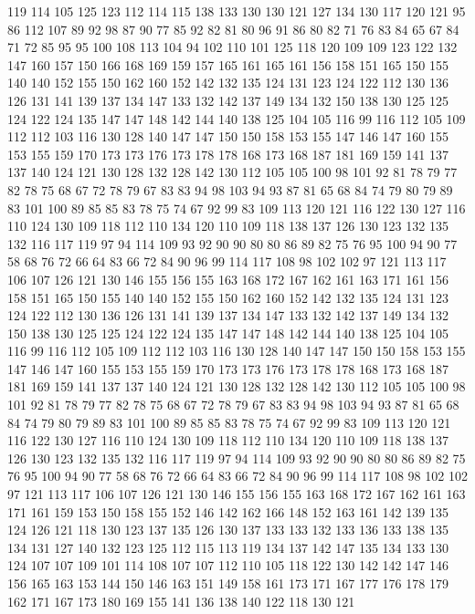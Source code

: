 119 114 105 125 123 112 114 115 138 133 130 130 121 127 134 130 117 120 121 95
86 112 107 89 92 98 87 90 77 85 92 82 81 80 96 91 86 80 82 71
76 83 84 65 67 84 71 72 85 95 95 100 108 113 104 94 102 110 101 125
118 120 109 109 123 122 132 147 160 157 150 166 168 169 159 157 165 161 165 161
156 158 151 165 150 155 140 140 152 155 150 162 160 152 142 132 135 124 131 123
124 122 112 130 136 126 131 141 139 137 134 147 133 132 142 137 149 134 132 150
138 130 125 125 124 122 124 135 147 147 148 142 144 140 138 125 104 105 116 99
116 112 105 109 112 112 103 116 130 128 140 147 147 150 150 158 153 155 147 146
147 160 155 153 155 159 170 173 173 176 173 178 178 168 173 168 187 181 169 159
141 137 137 140 124 121 130 128 132 128 142 130 112 105 105 100 98 101 92 81
78 79 77 82 78 75 68 67 72 78 79 67 83 83 94 98 103 94 93 87
81 65 68 84 74 79 80 79 89 83 101 100 89 85 85 83 78 75 74 67
92 99 83 109 113 120 121 116 122 130 127 116 110 124 130 109 118 112 110 134
120 110 109 118 138 137 126 130 123 132 135 132 116 117 119 97 94 114 109 93
92 90 90 80 80 86 89 82 75 76 95 100 94 90 77 58 68 76 72 66
64 83 66 72 84 90 96 99 114 117 108 98 102 102 97 121 113 117 106 107
126 121 130 146 155 156 155 163 168 172 167 162 161 163 171 161 156 158 151 165
150 155 140 140 152 155 150 162 160 152 142 132 135 124 131 123 124 122 112 130
136 126 131 141 139 137 134 147 133 132 142 137 149 134 132 150 138 130 125 125
124 122 124 135 147 147 148 142 144 140 138 125 104 105 116 99 116 112 105 109
112 112 103 116 130 128 140 147 147 150 150 158 153 155 147 146 147 160 155 153
155 159 170 173 173 176 173 178 178 168 173 168 187 181 169 159 141 137 137 140
124 121 130 128 132 128 142 130 112 105 105 100 98 101 92 81 78 79 77 82
78 75 68 67 72 78 79 67 83 83 94 98 103 94 93 87 81 65 68 84
74 79 80 79 89 83 101 100 89 85 85 83 78 75 74 67 92 99 83 109
113 120 121 116 122 130 127 116 110 124 130 109 118 112 110 134 120 110 109 118
138 137 126 130 123 132 135 132 116 117 119 97 94 114 109 93 92 90 90 80
80 86 89 82 75 76 95 100 94 90 77 58 68 76 72 66 64 83 66 72
84 90 96 99 114 117 108 98 102 102 97 121 113 117 106 107 126 121 130 146
155 156 155 163 168 172 167 162 161 163 171 161 159 153 150 158 155 152 146 142
162 166 148 152 163 161 142 139 135 124 126 121 118 130 123 137 135 126 130 137
133 133 132 133 136 133 138 135 134 131 127 140 132 123 125 112 115 113 119 134
137 142 147 135 134 133 130 124 107 107 109 101 114 108 107 107 112 110 105 118
122 130 142 142 147 146 156 165 163 153 144 150 146 163 151 149 158 161 173 171
167 177 176 178 179 162 171 167 173 180 169 155 141 136 138 140 122 118 130 121

